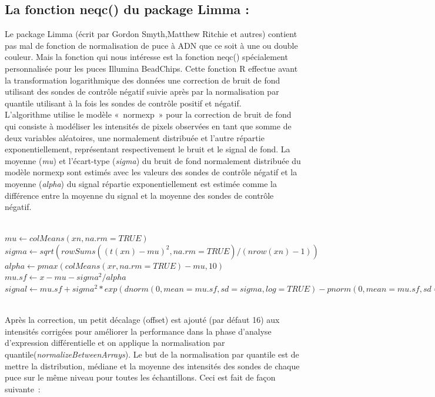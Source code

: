 \documentclass[a4paper,10pt]{article}
\begin{document}
\subsection{La fonction neqc() du package Limma :}
Le package Limma (écrit par Gordon Smyth,Matthew Ritchie et autres) contient pas mal de fonction de normalisation de puce à ADN que ce soit à une ou double couleur. Mais la fonction qui nous intéresse est la fonction neqc() spécialement personnalisée pour les puces Illumina BeadChips.
Cette fonction R effectue avant la transformation logarithmique des données une correction de bruit de fond utilisant des sondes de contrôle négatif suivie après par la normalisation par quantile utilisant à la fois les sondes de contrôle positif et négatif.
\\L’algorithme utilise le modèle « normexp »\cite{silver2009microarray} pour la correction de bruit de fond qui consiste à modéliser les intensités de pixels observées en tant que somme de deux variables aléatoires, une normalement distribuée et l’autre répartie exponentiellement, représentant respectivement le bruit et le signal de fond. 
La moyenne (\emph{mu}) et l’écart-type (\emph{sigma}) du bruit de fond normalement distribuée du modèle normexp sont estimés avec les valeurs des sondes de contrôle négatif et  la moyenne (\emph{alpha}) du signal répartie exponentiellement est estimée comme la différence entre la moyenne du signal et la moyenne des sondes de contrôle négatif.
\begin{scriptsize}
 \\$mu \leftarrow colMeans(xn, na.rm = TRUE)$
 \\$sigma \leftarrow sqrt(rowSums((t(xn) - mu)^2, na.rm = TRUE)/(nrow(xn) - 1))$
 \\$alpha \leftarrow pmax(colMeans(xr, na.rm = TRUE) - mu, 10)$
 \\$mu.sf \leftarrow x - mu - sigma^2/alpha$
 \\$signal \leftarrow mu.sf + sigma^2 * exp(dnorm(0, mean = mu.sf, sd = sigma, log = TRUE) - pnorm(0, mean = mu.sf, sd = sigma, lower.tail = FALSE, log.p = TRUE))$
\end{scriptsize}
\\Après la correction, un petit décalage (offset) est ajouté (par défaut 16) aux intensités corrigées pour  améliorer la performance dans la phase d’analyse d’expression différentielle et on applique la normalisation par quantile(\emph{normalizeBetweenArrays}).
Le but de la normalisation par quantile est de mettre la distribution, médiane et la moyenne des intensités des sondes de chaque puce sur le même niveau pour toutes les échantillons. Ceci est fait de façon suivante :
\end{document}
